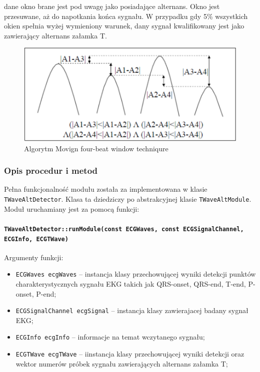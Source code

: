 \documentclass[a4paper, 11pt]{article}
\begin{document}
dane okno brane jest pod uwagę jako posiadające alternans. Okno jest przesuwane, aż do napotkania końca sygnału. W przypadku gdy 5\% wszystkich okien spełnia wyżej wymieniony warunek, dany sygnał kwalifikowany jest jako zawierający alternans załamka T. 

\begin{center}
%
\begin{figure}
\begin{centering}
\includegraphics[scale=0.4]{include/twa_1}
\par\end{centering}

\caption{Algorytm Movign four-beat window techniqure}
\label{fig:twa_1}
\end{figure}

\par\end{center}

\subsubsection{Opis procedur i metod}
\label{sec::t_wave_alt:procs}

Pełna funkcjonalność modułu została za implementowana w klasie \verb|TWaveAltDetector|. Klasa ta dziedziczy po abstrakcyjnej klasie  \verb|TWaveAltModule|. Moduł uruchamiany jest za pomocą funkcji: 

\paragraph{\texttt{TWaveAltDetector::runModule(const ECGWaves, const ECGSignalChannel, ECGInfo, ECGTWave)}}

\medskip{}

Argumenty funkcji:

\begin{itemize}
\item \verb+ECGWaves ecgWaves+ -- instancja klasy przechowującej wyniki detekcji punktów charakterystycznych sygnału EKG takich jak QRS-onset, QRS-end, T-end, P-onset, P-end;
\item \verb+ECGSignalChannel ecgSignal+ -- instancja klasy zawierajacej badany sygnał EKG;
\item \verb+ECGInfo ecgInfo+ -- informacje na temat wczytanego sygnału;
\item \verb+ECGTWave ecgTWave+ -- iinstancja klasy przechowującej wyniki detekcji oraz wektor numerów próbek sygnału zawierających alternans załamka T;
\end{itemize}
\medskip{}
\end{document}
